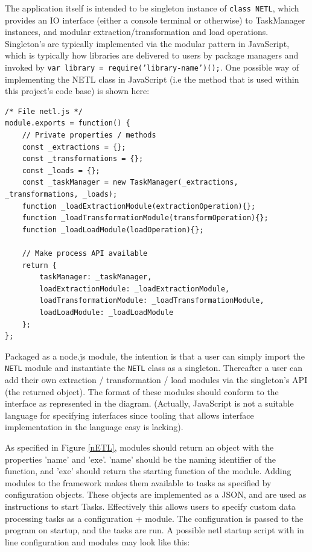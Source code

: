 The application itself is intended to be singleton instance of \texttt{class NETL{}}, which provides an IO interface (either a console terminal or otherwise) to TaskManager instances, and modular extraction/transformation and load operations. Singleton's are typically implemented via the modular pattern in JavaScript, which is typically how libraries are delivered to users by package managers and invoked by \texttt{var library = require('library-name')();}. One possible way of implementing the NETL class in JavaScript (i.e the method that is used within this project's code base) is shown here:

\begin{verbatim}
/* File netl.js */
module.exports = function() {
    // Private properties / methods
    const _extractions = {};
    const _transformations = {};
    const _loads = {};        
    const _taskManager = new TaskManager(_extractions, _transformations, _loads);
    function _loadExtractionModule(extractionOperation){};
    function _loadTransformationModule(transformOperation){};
    function _loadLoadModule(loadOperation){};

    // Make process API available
    return {
        taskManager: _taskManager,
        loadExtractionModule: _loadExtractionModule,
        loadTransformationModule: _loadTransformationModule,
        loadLoadModule: _loadLoadModule
    };
};
\end{verbatim}

Packaged as a node.js module, the intention is that a user can simply import the \texttt{NETL} module and instantiate the \texttt{NETL} class as a singleton. Thereafter a user can add their own extraction / transformation / load modules via the singleton's API (the returned object). The format of these modules should conform to the interface as represented in the diagram. (Actually, JavaScript is not a suitable language for specifying interfaces since tooling that allows interface implementation in the language easy is lacking).

As specified in Figure \ref{nETL}, modules should return an object with the properties 'name' and 'exe'. 'name' should be the naming identifier of the function, and 'exe' should return the starting function of the module. Adding modules to the framework makes them available to tasks as specified by configuration objects. These objects are implemented as a JSON, and are used as instructions to start Tasks. Effectively this allows users to specify custom data processing tasks as a configuration + module. The configuration is passed to the program on startup, and the tasks are run. A possible netl startup script with in line configuration and modules may look like this:

